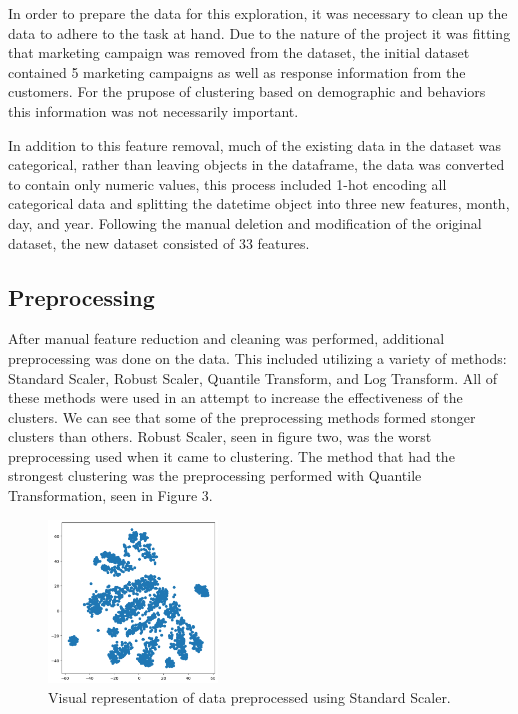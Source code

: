 \documentclass{article}
\begin{document}
\begin{multicols}{2}
In order to prepare the data for this exploration, it was necessary to clean up the data to adhere to the task at hand.
Due to the nature of the project it was fitting that marketing campaign was removed from the dataset, the initial dataset contained 5 marketing campaigns as well as response information from the customers. For the prupose of clustering based on demographic and behaviors this information was not necessarily important.
 
In addition to this feature removal, much of the existing data in the dataset was categorical, rather than leaving objects
in the dataframe, the data was converted to contain only numeric values, this process included 1-hot encoding all categorical
data and splitting the datetime object into three new features, month, day, and year. Following the manual deletion and modification
of the original dataset, the new dataset consisted of 33 features.

\subsection{Preprocessing}

After manual feature reduction and cleaning was performed, additional preprocessing was done on the data. This included utilizing
a variety of methods: Standard Scaler, Robust Scaler, Quantile Transform, and Log Transform. All of these methods were used 
in an attempt to increase the effectiveness of the clusters. We can see that some of the preprocessing methods formed stonger clusters than others. Robust Scaler, seen in figure two, was the worst preprocessing used when it came to clustering. The method that had the strongest clustering was the preprocessing performed with Quantile Transformation, seen in Figure 3.

\begin{figure}[H]
    \centering
    \includegraphics[width=0.4\textwidth]{images/standard_scaler.png}
    \caption{Visual representation of data preprocessed using Standard Scaler.}
\end{figure}


\end{multicols}
\end{document}
